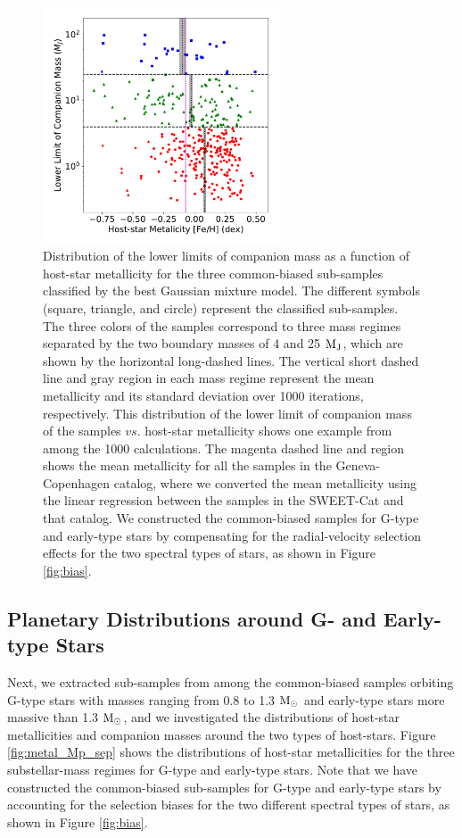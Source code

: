 \documentclass[twocolumn]{aastex62}
\begin{document}
\begin{CJK*}{UTF8}{min}
\begin{figure}[t]
\begin{center}
\includegraphics[width=7cm]{gmm.pdf}
\caption{Distribution of the lower limits of companion mass as a function of host-star metallicity for the three common-biased sub-samples classified by the best Gaussian mixture model. The different symbols (square, triangle, and circle) represent the classified sub-samples. The three colors of the samples correspond to three mass regimes separated by the two boundary masses of 4 and 25 $\rm M_J$, which are shown by the horizontal long-dashed lines. The vertical short dashed line and gray region in each mass regime represent the mean metallicity and its standard deviation over 1000 iterations, respectively. This distribution of the lower limit of companion mass of the samples $vs.$ host-star metallicity shows one example from among the 1000 calculations. The magenta dashed line and region shows the mean metallicity for all the samples in the Geneva-Copenhagen catalog, where we converted the mean metallicity using the linear regression between the samples in the SWEET-Cat and that catalog. We constructed the common-biased samples for G-type and early-type stars by compensating for the radial-velocity selection effects for the two spectral types of stars, as shown in Figure \ref{fig:bias}.}
\label{fig:gmm}
\end{center}
\end{figure}


\subsection{Planetary Distributions around G- and Early-type Stars} \label{subsec:separate}

Next, we extracted sub-samples from among the common-biased samples orbiting G-type stars with masses ranging from 0.8 to 1.3 $\rm M_{\odot}$ and early-type stars more massive than 1.3 $\rm M_{\odot}$, and we investigated the distributions of host-star metallicities and companion masses around the two types of host-stars. Figure \ref{fig:metal_Mp_sep} shows the distributions of host-star metallicities for the three substellar-mass regimes for G-type and early-type stars. Note that we have constructed the common-biased sub-samples for G-type and early-type stars by accounting for the selection biases for the two different spectral types of stars, as shown in Figure \ref{fig:bias}. 


\end{CJK*}
\end{document}
